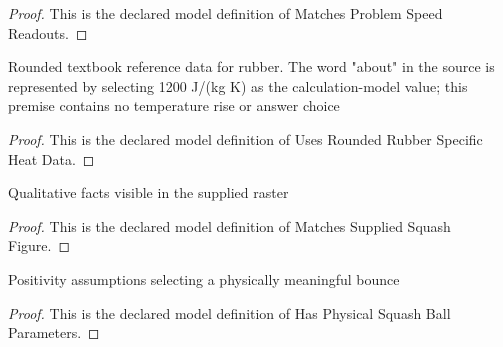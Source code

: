 \begin{proof}
  This is the declared model definition of Matches Problem Speed Readouts.
\end{proof}
\begin{definition}
  \label{def:physics:phyx-mini-0490:phyxminiproblems-problemphyxmini0490-usesroundedrubberspecificheatdata}
  Rounded textbook reference data for rubber. The word "about" in the source is represented by selecting 1200 J/(kg K) as the calculation-model value; this premise contains no temperature rise or answer choice
\end{definition}
\begin{proof}
  This is the declared model definition of Uses Rounded Rubber Specific Heat Data.
\end{proof}
\begin{definition}
  \label{def:physics:phyx-mini-0490:phyxminiproblems-problemphyxmini0490-matchessuppliedsquashfigure}
  Qualitative facts visible in the supplied raster
\end{definition}
\begin{proof}
  This is the declared model definition of Matches Supplied Squash Figure.
\end{proof}
\begin{definition}
  \label{def:physics:phyx-mini-0490:phyxminiproblems-problemphyxmini0490-hasphysicalsquashballparameters}
  Positivity assumptions selecting a physically meaningful bounce
\end{definition}
\begin{proof}
  This is the declared model definition of Has Physical Squash Ball Parameters.
\end{proof}
